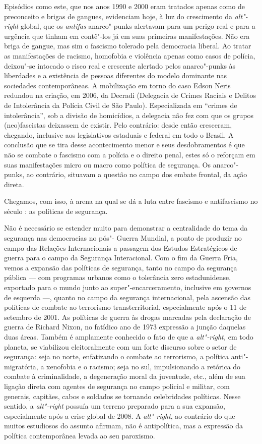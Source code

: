 Episódios como este, que nos anos 1990 e 2000 eram tratados apenas como
de preconceito e brigas de gangues, evidenciam hoje, à luz do
crescimento da \emph{alt"-right} global, que os \emph{antifas}
anarco"-punks alertavam para um perigo real e para a urgência que tinham
em contê"-los já em suas primeiras manifestações. Não era briga de
gangue, mas sim o fascismo tolerado pela democracia liberal. Ao tratar
as manifestações de racismo, homofobia e violência apenas como casos de
polícia, deixou"-se intocado o risco real e crescente alertado pelos
anarco"-punks às liberdades e a existência de pessoas diferentes do
modelo dominante nas sociedades contemporâneas. A mobilização em torno
do caso Edson Neris redundou na criação, em 2006, da Decradi (Delegacia
de Crimes Raciais e Delitos de Intolerância da Polícia Civil de São
Paulo). Especializada em ``crimes de intolerância'', sob a divisão de
homicídios, a delegacia não fez com que os grupos (neo)fascistas
deixassem de existir. Pelo contrário: desde então cresceram, chegando,
inclusive aos legislativos estaduais e federal em todo o Brasil. A
conclusão que se tira desse acontecimento menor e seus desdobramentos é
que não se combate o fascismo com a polícia e o direito penal, estes só
o reforçam em suas manifestações micro ou macro como política de
segurança. Os anarco"-punks, ao contrário, situavam a questão no campo
dos embate frontal, da ação direta.

Chegamos, com isso, à arena na qual se dá a luta entre fascismo e
antifascismo no século : as políticas de segurança.

Não é necessário se estender muito para demonstrar a centralidade do
tema da segurança nas democracias no pós"- Guerra Mundial, a ponto de
produzir no campo das Relações Internacionais a passagem dos Estudos
Estratégicos de guerra para o campo da Segurança Interacional. Com o fim
da Guerra Fria, vemos a expansão das políticas de segurança, tanto no
campo da segurança pública --- com programas urbanos como o tolerância
zero estadunidense, exportado para o mundo junto ao
super"-encarceramento, inclusive em governos de esquerda ---, quanto no
campo da segurança internacional, pela ascensão das políticas de combate
ao terrorismo transterritorial, especialmente após o 11 de setembro de
2001. As políticas de guerra às drogas marcadas pela declaração de
guerra de Richard Nixon, no fatídico ano de 1973 expressão a junção
daquelas duas áreas. Também é amplamente conhecido o fato de que a
\emph{alt"-right,} em todo planeta, se viabilizou eleitoralmente com um
forte discurso sobre o setor de segurança: seja no norte, enfatizando o
combate ao terrorismo, a política anti"-migratória, a xenofobia e o
racismo; seja no sul, impulsionando a retórica do combate à
criminalidade, a degeneração moral da juventude, etc., além de sua
ligação direta com agentes de segurança no campo policial e militar, com
generais, capitães, cabos e soldados se tornando celebridades políticas.
Nesse sentido, a \emph{alt"-right} possuía um terreno preparado para a
sua expansão, especialmente após a crise global de 2008. A
\emph{alt"-right}, ao contrário do que muitos estudiosos do assunto
afirmam, não é antipolítica, mas a expressão da política contemporânea
levada ao seu paroxismo.


